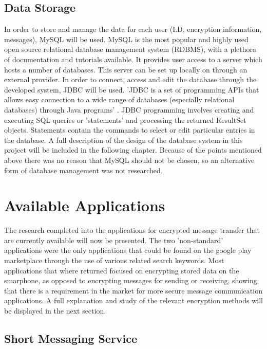 \documentclass[a4paper,12pt]{report}
\begin{document}
\subsection{Data Storage}

In order to store and manage the data for each user (I.D, encryption information, messages), MySQL \cite{mysql} will be used. MySQL is the most popular and highly used open source relational database management system (RDBMS), with a plethora of documentation and tutorials available. It provides user access to a server which hosts a number of databases. This server can be set up locally on through an external provider. In order to connect, access and edit the database through the developed system, JDBC will be used. 'JDBC is a set of programming APIs that allows easy connection to a wide range of databases (especially relational databases) through Java programs' \cite{jdbcmysql}. JDBC programming involves creating and executing SQL queries or 'statements' and processing the returned ResultSet objects. Statements contain the commands to select or edit particular entries in the database. A full description of the design of the database system in this project will be included in the following chapter. Because of the points mentioned above there was no reason that MySQL should not be chosen, so an alternative form of database management was not researched. 

\section{Available Applications}

The research completed into the applications for encrypted message transfer that are currently available will now be presented. The two 'non-standard' applications were the only applications that could be found on the google play marketplace \cite{googleplay} through the use of various related search keywords. Most applications that where returned focused on encrypting stored data on the smarphone, as opposed to encrypting messages for sending or receiving, showing that there is a requirement in the market for more secure message communication applications. A full explanation and study of the relevant encryption methods will be displayed in the next section.

\subsection{Short Messaging Service}
\end{document}
